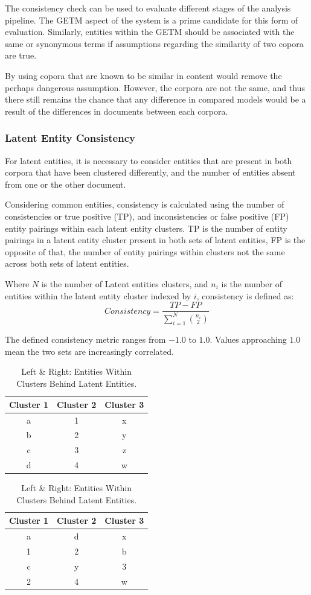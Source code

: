 \documentclass[10pt]{report}
\begin{document}
The consistency check can be used to evaluate different stages of the analysis pipeline. The GETM aspect of the system is a prime candidate for this form of evaluation. Similarly, entities within the GETM should be associated with the same or synonymous terms if assumptions regarding the similarity of two copora are true.

By using copora that are known to be similar in content would remove the perhaps dangerous assumption. However, the corpora are not the same, and thus there still remains the chance that any difference in compared models would be a result of the differences in documents between each corpora.

\subsubsection{Latent Entity Consistency}
For latent entities, it is necessary to consider entities that are present in both corpora that have been clustered differently, and the number of entities absent from one or the other document.

Considering common entities, consistency is calculated using the number of consistencies or true positive (TP), and inconsistencies or false positive (FP) entity pairings within each latent entity clusters. TP is the number of entity pairings in a latent entity cluster present in both sets of latent entities, FP is the opposite of that, the number of entity pairings within clusters not the same across both sets of latent entities.

Where $N$ is the number of Latent entities clusters, and $n_i$ is the number of entities within the latent entity cluster indexed by $i$, consistency is defined as:
\[
  Consistency = \frac{TP - FP}{\sum^{N}_{i=1}{n_i\choose2}}
\]

The defined consistency metric ranges from $-1.0$ to $1.0$. Values approaching $1.0$ mean the two sets are increasingly correlated.

\begin{table}[h!]
  \centering
  \begin{tabular}{c | c | c}
    Cluster 1 & Cluster 2 & Cluster 3 \\
    \hline
    a & 1 & x \\
    b & 2 & y \\
    c & 3 & z \\
    d & 4 & w \\
  \end{tabular}
  \quad
  \begin{tabular}{c | c | c}
    Cluster 1 & Cluster 2 & Cluster 3 \\
    \hline
    a & d & x \\
    1 & 2 & b \\
    c & y & 3 \\
    2 & 4 & w \\
  \end{tabular}
  \caption{Left \& Right: Entities Within Clusters Behind Latent Entities.\label{tab:latent_entity_clusters}}
\end{table}
\end{document}
